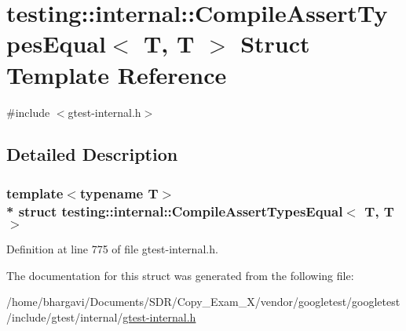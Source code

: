 \hypertarget{structtesting_1_1internal_1_1_compile_assert_types_equal_3_01_t_00_01_t_01_4}{}\section{testing\+:\+:internal\+:\+:Compile\+Assert\+Types\+Equal$<$ T, T $>$ Struct Template Reference}
\label{structtesting_1_1internal_1_1_compile_assert_types_equal_3_01_t_00_01_t_01_4}


{\ttfamily \#include $<$gtest-\/internal.\+h$>$}



\subsection{Detailed Description}
\subsubsection*{template$<$typename T$>$\\*
struct testing\+::internal\+::\+Compile\+Assert\+Types\+Equal$<$ T, T $>$}



Definition at line 775 of file gtest-\/internal.\+h.



The documentation for this struct was generated from the following file\+:\begin{DoxyCompactItemize}
\item 
/home/bhargavi/\+Documents/\+S\+D\+R/\+Copy\+\_\+\+Exam\+\_\+X/vendor/googletest/googletest/include/gtest/internal/\hyperlink{gtest-internal_8h}{gtest-\/internal.\+h}\end{DoxyCompactItemize}
